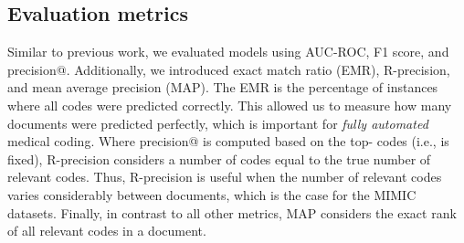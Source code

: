 \documentclass[anonymous=false, sigconf=true, review=false, natbib=true]{acmart}
\begin{document}
\subsection{Evaluation metrics}
\label{sec:metrics}
Similar to previous work, we evaluated models using AUC-ROC, F1 score, and precision@. Additionally, we introduced exact match ratio (EMR), R-precision, and mean average precision (MAP). The EMR is the percentage of instances where all codes were predicted correctly. This allowed us to measure how many documents were predicted perfectly, which is important for \textit{fully automated} medical coding.
Where precision@ is computed based on the top- codes (i.e.,  is fixed), R-precision considers a number of codes equal to the true number of relevant codes. Thus, R-precision is useful when the number of relevant codes varies considerably between documents, which is the case for the MIMIC datasets. Finally, in contrast to all other metrics, MAP considers the exact rank of all relevant codes in a document.
\end{document}
